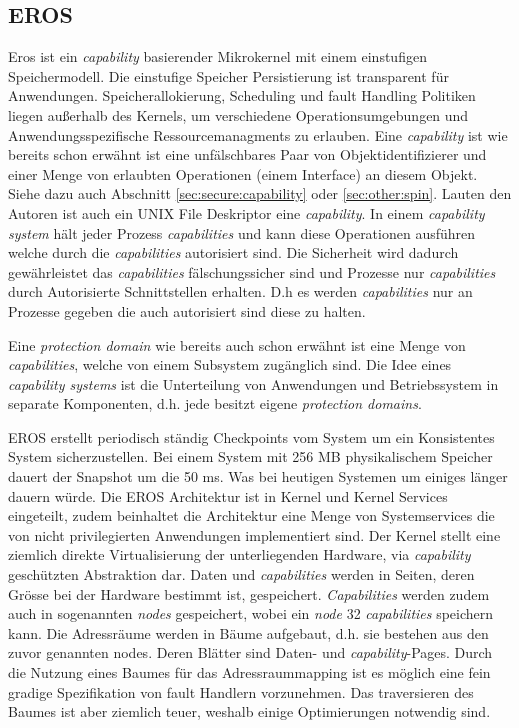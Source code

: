 \documentclass[german, 9pt,technote]{IEEEtran}
\begin{document}
    \subsection{EROS}      
      Eros ist ein \textit{capability} basierender Mikrokernel mit einem einstufigen Speichermodell. 
      Die einstufige Speicher Persistierung ist transparent f\"ur Anwendungen. Speicherallokierung, Scheduling und fault Handling Politiken 
      liegen au\ss erhalb des Kernels, um verschiedene Operationsumgebungen und Anwendungsspezifische Ressourcemanagments zu erlauben.
      Eine \textit{capability} ist wie bereits schon erw\"ahnt ist eine unf\"alschbares Paar von Objektidentifizierer und einer Menge von erlaubten Operationen
      (einem Interface) an diesem Objekt. Siehe dazu auch Abschnitt \ref{sec:secure:capability} oder \ref{sec:other:spin}.
      Lauten den Autoren ist auch ein UNIX File Deskriptor eine \textit{capability}. In einem \textit{capability system} 
      h\"alt jeder Prozess \textit{capabilities} und kann diese Operationen ausf\"uhren welche durch die \textit{capabilities} autorisiert sind. 
      Die Sicherheit wird dadurch gew\"ahrleistet das \textit{capabilities} f\"alschungssicher sind und Prozesse nur \textit{capabilities} durch
      Autorisierte Schnittstellen erhalten. D.h es werden \textit{capabilities} nur an Prozesse gegeben die auch autorisiert sind diese zu halten.
        
      Eine \textit{protection domain} wie bereits auch schon erw\"ahnt ist eine Menge von \textit{capabilities}, welche von einem Subsystem zug\"anglich sind.
      Die Idee eines \textit{capability systems} ist die Unterteilung von Anwendungen und Betriebssystem in separate Komponenten, d.h. jede besitzt eigene
      \textit{protection domains}.
        
      EROS erstellt periodisch st\"andig Checkpoints vom System um ein Konsistentes System sicherzustellen. Bei einem System mit 256 MB physikalischem Speicher
      dauert der Snapshot um die 50 ms. Was bei heutigen Systemen um einiges l\"anger dauern w\"urde.
      Die EROS Architektur ist in Kernel und Kernel Services eingeteilt, zudem beinhaltet die Architektur eine Menge von Systemservices
      die von nicht privilegierten Anwendungen implementiert sind.
      Der Kernel stellt eine ziemlich direkte Virtualisierung der unterliegenden Hardware, via \textit{capability} gesch\"utzten Abstraktion dar.
      Daten und \textit{capabilities} werden in Seiten, deren Gr\"osse bei der Hardware bestimmt ist, gespeichert. 
      \textit{Capabilities} werden zudem auch in sogenannten \textit{nodes} gespeichert, wobei ein \textit{node} 32 \textit{capabilities} speichern kann.
      Die Adressr\"aume werden in B\"aume aufgebaut, d.h. sie bestehen aus den zuvor genannten nodes. Deren Bl\"atter sind Daten- und \textit{capability}-Pages.
      Durch die Nutzung eines Baumes f\"ur das Adressraummapping ist es m\"oglich eine fein gradige Spezifikation von fault Handlern vorzunehmen.
      Das traversieren des Baumes ist aber ziemlich teuer, weshalb einige Optimierungen notwendig sind. 
        
\end{document}
